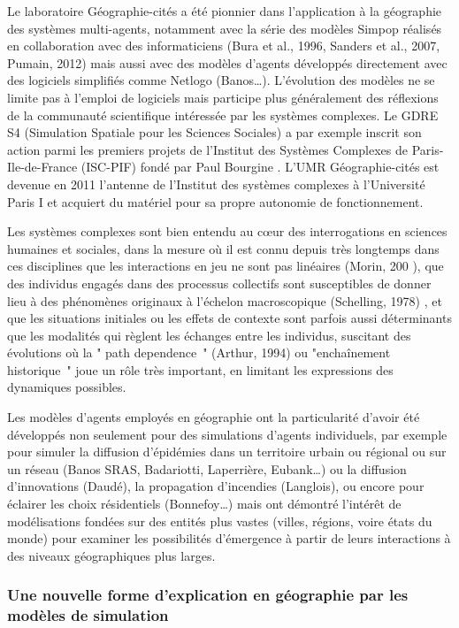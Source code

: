 Le laboratoire Géographie-cités a été pionnier dans l’application à la géographie des systèmes multi-agents, notamment avec la série des modèles Simpop réalisés en collaboration avec des informaticiens (Bura et al., 1996, Sanders et al., 2007, Pumain, 2012) mais aussi avec des modèles d’agents développés directement avec des logiciels simplifiés comme Netlogo (Banos…). L’évolution des modèles ne se limite pas à l’emploi de logiciels mais participe plus généralement des réflexions de la communauté scientifique intéressée par les systèmes complexes. Le GDRE S4 (Simulation Spatiale pour les Sciences Sociales) a par exemple inscrit son action parmi les premiers projets de l’Institut des Systèmes Complexes de Paris-Ile-de-France (ISC-PIF) fondé par Paul Bourgine . L’UMR  Géographie-cités est devenue en 2011 l’antenne  de l’Institut des systèmes complexes à l’Université Paris I et acquiert du matériel pour sa propre autonomie de fonctionnement.

Les systèmes complexes sont bien entendu au cœur des interrogations en sciences humaines et sociales, dans la mesure où il est connu depuis très longtemps dans ces disciplines que les interactions en jeu ne sont pas linéaires   (Morin, 200 ), que des individus engagés dans des processus collectifs sont susceptibles de donner lieu à des phénomènes originaux à l’échelon macroscopique (Schelling, 1978) , et que les situations initiales ou les effets de contexte sont parfois aussi déterminants que les modalités qui règlent les échanges entre les individus, suscitant des évolutions où la " path dependence "  (Arthur, 1994) ou "enchaînement historique " joue un rôle très important, en limitant les expressions des dynamiques possibles.

Les modèles d’agents employés en géographie ont la particularité d’avoir été développés non seulement pour des simulations d’agents individuels, par exemple pour simuler la diffusion d’épidémies dans un territoire urbain ou régional ou sur un réseau (Banos SRAS, Badariotti, Laperrière, Eubank…) ou la diffusion d’innovations (Daudé), la propagation d’incendies (Langlois), ou encore pour éclairer les choix résidentiels (Bonnefoy…) mais ont démontré l’intérêt de modélisations fondées sur des entités plus vastes (villes, régions, voire états du monde) pour examiner les possibilités d’émergence à partir de leurs interactions à des niveaux géographiques plus larges. 

\subsubsection{Une nouvelle forme d’explication en géographie par les modèles de simulation}

